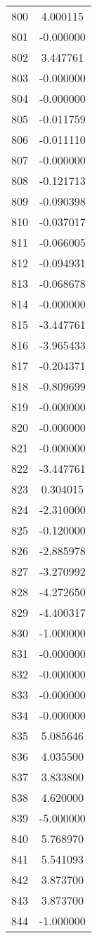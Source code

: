 \documentclass[12pt]{article}
\begin{document}
\begin{longtable}{@{}cc@{}}
800 & 4.000115 \\
801 & -0.000000 \\
802 & 3.447761 \\
803 & -0.000000 \\
804 & -0.000000 \\
805 & -0.011759 \\
806 & -0.011110 \\
807 & -0.000000 \\
808 & -0.121713 \\
809 & -0.090398 \\
810 & -0.037017 \\
811 & -0.066005 \\
812 & -0.094931 \\
813 & -0.068678 \\
814 & -0.000000 \\
815 & -3.447761 \\
816 & -3.965433 \\
817 & -0.204371 \\
818 & -0.809699 \\
819 & -0.000000 \\
820 & -0.000000 \\
821 & -0.000000 \\
822 & -3.447761 \\
823 & 0.304015 \\
824 & -2.310000 \\
825 & -0.120000 \\
826 & -2.885978 \\
827 & -3.270992 \\
828 & -4.272650 \\
829 & -4.400317 \\
830 & -1.000000 \\
831 & -0.000000 \\
832 & -0.000000 \\
833 & -0.000000 \\
834 & -0.000000 \\
835 & 5.085646 \\
836 & 4.035500 \\
837 & 3.833800 \\
838 & 4.620000 \\
839 & -5.000000 \\
840 & 5.768970 \\
841 & 5.541093 \\
842 & 3.873700 \\
843 & 3.873700 \\
844 & -1.000000 \\

\end{longtable}
\end{document}
